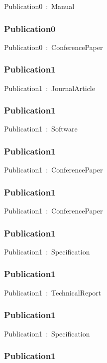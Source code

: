 \documentclass{article}
\begin{document}
Publication0~:~Manual

\subsubsection*{Publication0}

Publication0~:~ConferencePaper

\subsubsection*{Publication1}

Publication1~:~JournalArticle

\subsubsection*{Publication1}

Publication1~:~Software

\subsubsection*{Publication1}

Publication1~:~ConferencePaper

\subsubsection*{Publication1}

Publication1~:~ConferencePaper

\subsubsection*{Publication1}

Publication1~:~Specification

\subsubsection*{Publication1}

Publication1~:~TechnicalReport

\subsubsection*{Publication1}

Publication1~:~Specification

\subsubsection*{Publication1}
\end{document}
